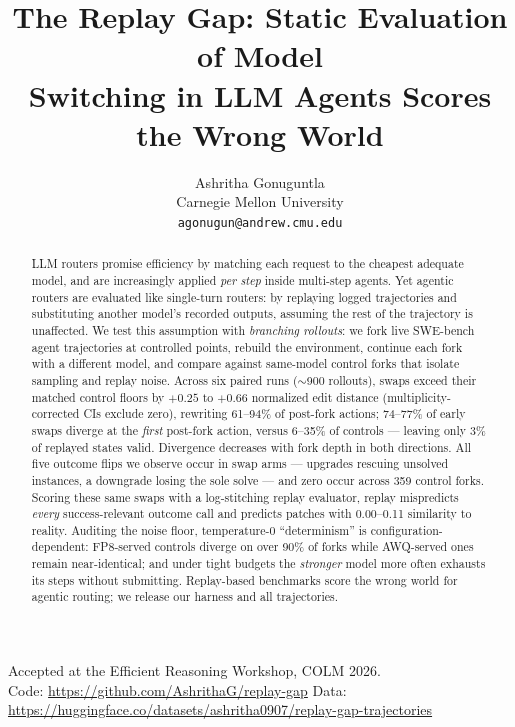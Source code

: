 \documentclass{article}
\title{The Replay Gap: Static Evaluation of Model\\Switching in LLM Agents Scores the Wrong World}
\author{Ashritha Gonuguntla \\
Carnegie Mellon University \\
\texttt{agonugun@andrew.cmu.edu}}
\begin{document}
\maketitle

\begin{center}
\vspace{-1.5em}
\small Accepted at the Efficient Reasoning Workshop, COLM 2026.\\
Code: \url{https://github.com/AshrithaG/replay-gap} \quad
Data: \url{https://huggingface.co/datasets/ashritha0907/replay-gap-trajectories}
\end{center}

\begin{abstract}
LLM routers promise efficiency by matching each request to the cheapest adequate model, and are increasingly applied \emph{per step} inside multi-step agents. Yet agentic routers are evaluated like single-turn routers: by replaying logged trajectories and substituting another model's recorded outputs, assuming the rest of the trajectory is unaffected. We test this assumption with \emph{branching rollouts}: we fork live SWE-bench agent trajectories at controlled points, rebuild the environment, continue each fork with a different model, and compare against same-model control forks that isolate sampling and replay noise. Across six paired runs ($\sim$900 rollouts), swaps exceed their matched control floors by $+0.25$ to $+0.66$ normalized edit distance (multiplicity-corrected CIs exclude zero), rewriting 61--94\% of post-fork actions; 74--77\% of early swaps diverge at the \emph{first} post-fork action, versus 6--35\% of controls --- leaving only 3\% of replayed states valid. Divergence decreases with fork depth in both directions. All five outcome flips we observe occur in swap arms --- upgrades rescuing unsolved instances, a downgrade losing the sole solve --- and zero occur across 359 control forks. Scoring these same swaps with a log-stitching replay evaluator, replay mispredicts \emph{every} success-relevant outcome call and predicts patches with 0.00--0.11 similarity to reality. Auditing the noise floor, temperature-0 ``determinism'' is configuration-dependent: FP8-served controls diverge on over 90\% of forks while AWQ-served ones remain near-identical; and under tight budgets the \emph{stronger} model more often exhausts its steps without submitting. Replay-based benchmarks score the wrong world for agentic routing; we release our harness and all trajectories.
\end{abstract}
\end{document}
